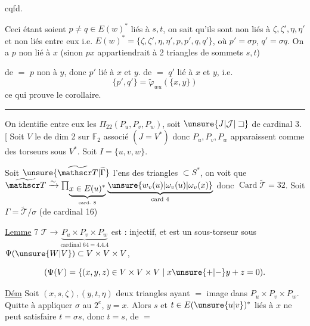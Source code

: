 
cqfd.

Ceci étant soient $p\ne q\in E(w)^*$ liés à $s,t$, on sait  qu'ils sont non liés à $\zeta,\zeta',\eta,\eta'$ et non liés entre eux i.e. $E(w)^*=\{\zeta,\zeta',\eta,\eta',p,p',q,q'\}$, où $p'=\sigma p$, $q'=\sigma q$. On a $p$ non lié à $x$ (sinon $px$ appartiendrait à 2 triangles de sommets $s,t$)

de $=$ $p$ non  à $y$, donc $p'$ lié à $x$ et $y$. de $=$ $q'$ lié à $x$ et $y$, i.e.
\[
\{p',q'\}=\widetilde\varphi_{wu}(\{x,y\})
\]
ce qui prouve le corollaire.


\begin{center}\rule{2.2cm}{.35pt}\end{center}

On identifie entre eux les $\Pi_{22}(P_u,P_v,P_w)$, soit $\unsure{J|\mathcal J|\sqsupset}$ de cardinal 3. [ Soit $V$ le  de dim 2 sur $\mathbb F_2$ associé $(J=V^*)$ donc $P_u,P_v,P_w$ apparaissent comme des torseurs sous $V^*$. Soit $I=\{u,v,w\}$.

 Soit $\unsure{\widetilde{\mathscr T}|\widetilde\Gamma}$ l'ens des triangles $\subset S^*$, on voit que $\widetilde{\mathscr T}\xrightarrow{\sim}\prod_{\underbrace{x\in E(u)^*}_{\text{card. }8}}\underbrace{\unsure{w_v(u)|\omega_v(u)|\omega_v(x)}}_{\text{card }4}$ donc $\operatorname{Card}\widetilde{\mathscr T}=32$. Soit $\Gamma=\widetilde{\mathscr T}/\sigma$ (de cardinal 16)

\uline{Lemme} 7 $\mathscr T\longrightarrow\underbrace{P_u\times P_v\times P_w}_{\text{cardinal }64=4.4.4}$ est : injectif, et  est un sous-torseur sous $\Psi(\unsure{W|V})\subset V\times V\times V$,

\[
(\Psi(V)=\{(x,y,z)\in V\times V\times V\mid x\unsure{+|-}y+z=0).
\]

\uline{Dém} Soit $(x,s,\zeta),(y,t,\eta)$ deux triangles ayant $=$ image dans $P_u\times P_v\times P_w$. Quitte à appliquer $\sigma$ au $2^e$,  $y=x$. Alors $s$ et $t\in E(\unsure{u|v})^*$ liés à $x$ ne peut  satisfaire $t=\sigma s$, donc $t=s$, de $=$
